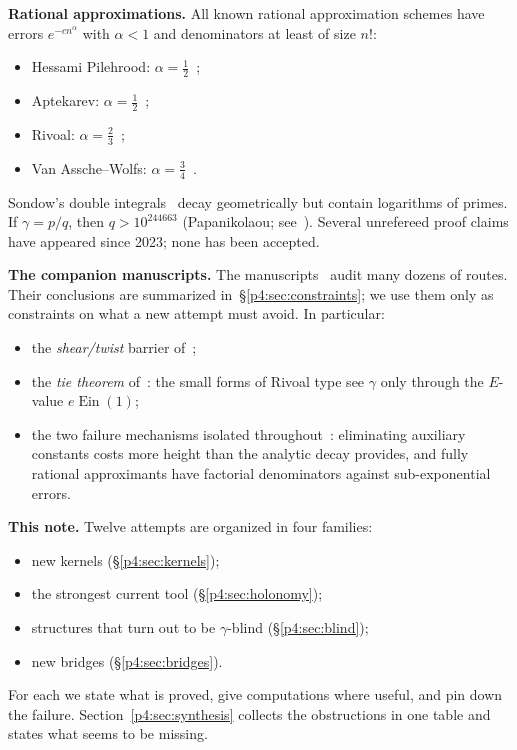 \documentclass[11pt,a4paper]{article}
\theoremstyle{definition}
\theoremstyle{remark}
\DeclareMathOperator{\Ein}{Ein}
\numberwithin{equation}{section}
\begin{document}
\medskip\noindent\textbf{Rational approximations.} All known rational approximation schemes have errors $e^{-cn^\alpha}$ with $\alpha<1$ and denominators at least of size $n!$:
\begin{itemize}[leftmargin=2em]
\item Hessami Pilehrood: $\alpha=\tfrac12$~\cite{p4:HP};
\item Aptekarev: $\alpha=\tfrac12$~\cite{p4:Apt};
\item Rivoal: $\alpha=\tfrac23$~\cite{p4:Riv09};
\item Van Assche--Wolfs: $\alpha=\tfrac34$~\cite{p4:VAW}.
\end{itemize}
Sondow's double integrals~\cite{p4:Son} decay geometrically but contain logarithms of primes. If $\gamma=p/q$, then $q>10^{244663}$ (Papanikolaou; see~\cite{p4:Lag}). Several unrefereed proof claims have appeared since 2023; none has been accepted.

\medskip\noindent\textbf{The companion manuscripts.} The manuscripts~\cite{p4:K1,p4:K2,p4:K3,p4:K4,p4:K5} audit many dozens of routes. Their conclusions are summarized in~\S\ref{p4:sec:constraints}; we use them only as constraints on what a new attempt must avoid. In particular:
\begin{itemize}[leftmargin=2em]
\item the \emph{shear/twist} barrier of~\cite{p4:K1};
\item the \emph{tie theorem} of~\cite{p4:K1}: the small forms of Rivoal type see $\gamma$ only through the $E$-value $e\Ein(1)$;
\item the two failure mechanisms isolated throughout~\cite{p4:K2,p4:K3,p4:K4,p4:K5}: eliminating auxiliary constants costs more height than the analytic decay provides, and fully rational approximants have factorial denominators against sub-exponential errors.
\end{itemize}

\medskip\noindent\textbf{This note.} Twelve attempts are organized in four families:
\begin{itemize}[leftmargin=2em]
\item new kernels (\S\ref{p4:sec:kernels});
\item the strongest current tool (\S\ref{p4:sec:holonomy});
\item structures that turn out to be $\gamma$-blind (\S\ref{p4:sec:blind});
\item new bridges (\S\ref{p4:sec:bridges}).
\end{itemize}
For each we state what is proved, give computations where useful, and pin down the failure. Section~\ref{p4:sec:synthesis} collects the obstructions in one table and states what seems to be missing.
\end{document}
